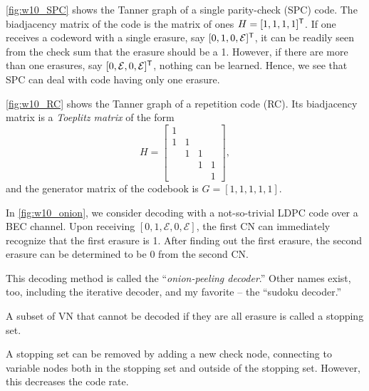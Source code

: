 \begin{example}
    \autoref{fig:w10_SPC} shows the Tanner graph of a single parity-check (SPC) code. The biadjacency matrix of the code is the matrix of ones $H = [1,1,1,1]^{\mathsf{T}}$. If one receives a codeword with a single erasure, say $[0,1,0,\mathcal{E}]^{\mathsf{T}}$, it can be readily seen from the check sum that the erasure should be a 1. However, if there are more than one erasures, say $[0,\mathcal{E},0,\mathcal{E}]^{\mathsf{T}}$, nothing can be learned. Hence, we see that SPC can deal with code having only one erasure.
\end{example}

\begin{example}
    \autoref{fig:w10_RC} shows the Tanner graph of a repetition code (RC). Its biadjacency matrix is a \textit{Toeplitz matrix} of the form
    \begin{equation*}
        H = \left[\begin{matrix}
            1 \\
            1 & 1 \\
            & 1 & 1 \\
            & & 1 & 1 \\
            & & & 1
        \end{matrix}\right],
    \end{equation*}
    and the generator matrix of the codebook is $G=[1,1,1,1,1]$.
\end{example}

\begin{example}
    In \autoref{fig:w10_onion}, we consider decoding with a not-so-trivial LDPC code over a BEC channel. Upon receiving $[0,1,\mathcal{E},0,\mathcal{E}]$, the first CN can immediately recognize that the first erasure is 1. After finding out the first erasure, the second erasure can be determined to be 0 from the second CN.

    This decoding method is called the ``\textit{onion-peeling decoder}.'' Other names exist, too, including the iterative decoder, and my favorite -- the ``sudoku decoder.''
\end{example}

\begin{definition}
    A subset of VN that cannot be decoded if they are all erasure is called a stopping set.
\end{definition}
A stopping set can be removed by adding a new check node, connecting to variable nodes both in the stopping set and outside of the stopping set. However, this decreases the code rate.

